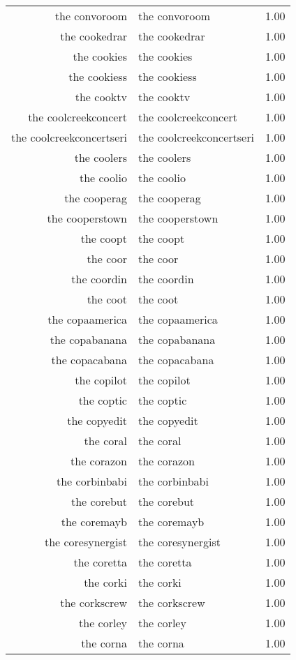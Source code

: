 \begin{table}[ht]
\begin{tabular}{rlr}
  the convoroom & the convoroom & 1.00 \\ 
  the cookedrar & the cookedrar & 1.00 \\ 
  the cookies & the cookies & 1.00 \\ 
  the cookiess & the cookiess & 1.00 \\ 
  the cooktv & the cooktv & 1.00 \\ 
  the coolcreekconcert & the coolcreekconcert & 1.00 \\ 
  the coolcreekconcertseri & the coolcreekconcertseri & 1.00 \\ 
  the coolers & the coolers & 1.00 \\ 
  the coolio & the coolio & 1.00 \\ 
  the cooperag & the cooperag & 1.00 \\ 
  the cooperstown & the cooperstown & 1.00 \\ 
  the coopt & the coopt & 1.00 \\ 
  the coor & the coor & 1.00 \\ 
  the coordin & the coordin & 1.00 \\ 
  the coot & the coot & 1.00 \\ 
  the copaamerica & the copaamerica & 1.00 \\ 
  the copabanana & the copabanana & 1.00 \\ 
  the copacabana & the copacabana & 1.00 \\ 
  the copilot & the copilot & 1.00 \\ 
  the coptic & the coptic & 1.00 \\ 
  the copyedit & the copyedit & 1.00 \\ 
  the coral & the coral & 1.00 \\ 
  the corazon & the corazon & 1.00 \\ 
  the corbinbabi & the corbinbabi & 1.00 \\ 
  the corebut & the corebut & 1.00 \\ 
  the coremayb & the coremayb & 1.00 \\ 
  the coresynergist & the coresynergist & 1.00 \\ 
  the coretta & the coretta & 1.00 \\ 
  the corki & the corki & 1.00 \\ 
  the corkscrew & the corkscrew & 1.00 \\ 
  the corley & the corley & 1.00 \\ 
  the corna & the corna & 1.00 \\ 

\end{tabular}
\end{table}
